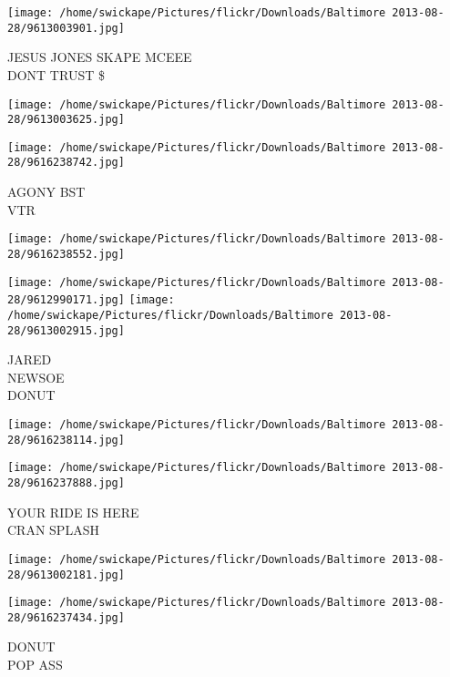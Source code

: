 \documentclass[10pt,letterpaper]{article}
\begin{document}
\vspace{0.25in}
\texttt{[image: /home/swickape/Pictures/flickr/Downloads/Baltimore 2013-08-28/9613003901.jpg]}

JESUS JONES SKAPE MCEEE\\
DONT TRUST \$\\
\pagebreak

\texttt{[image: /home/swickape/Pictures/flickr/Downloads/Baltimore 2013-08-28/9613003625.jpg]}

\vspace{0.25in}
\texttt{[image: /home/swickape/Pictures/flickr/Downloads/Baltimore 2013-08-28/9616238742.jpg]}

AGONY BST\\
VTR\\
\pagebreak

\texttt{[image: /home/swickape/Pictures/flickr/Downloads/Baltimore 2013-08-28/9616238552.jpg]}

\vspace{0.25in}
\texttt{[image: /home/swickape/Pictures/flickr/Downloads/Baltimore 2013-08-28/9612990171.jpg]}
\texttt{[image: /home/swickape/Pictures/flickr/Downloads/Baltimore 2013-08-28/9613002915.jpg]}

JARED\\
NEWSOE\\
DONUT\\
\pagebreak

\texttt{[image: /home/swickape/Pictures/flickr/Downloads/Baltimore 2013-08-28/9616238114.jpg]}

\vspace{0.25in}
\texttt{[image: /home/swickape/Pictures/flickr/Downloads/Baltimore 2013-08-28/9616237888.jpg]}

YOUR RIDE IS HERE\\
CRAN SPLASH\\
\pagebreak

\texttt{[image: /home/swickape/Pictures/flickr/Downloads/Baltimore 2013-08-28/9613002181.jpg]}

\vspace{0.25in}
\texttt{[image: /home/swickape/Pictures/flickr/Downloads/Baltimore 2013-08-28/9616237434.jpg]}

DONUT\\
POP ASS\\
\pagebreak
\end{document}
